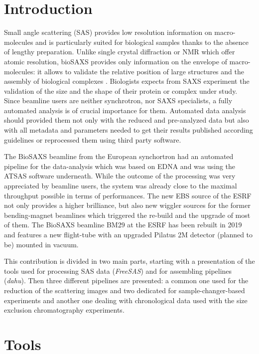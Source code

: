 \documentclass[preprint]{iucr}              %
\begin{document}
\section{Introduction}
Small angle scattering (SAS) provides low resolution information on macro-molecules and is  
particularly suited for biological samples thanks to the absence of lengthy preparation.
Unlike single crystal diffraction or NMR which offer atomic resolution, bioSAXS provides only information on the envelope of macro-molecules: it allows to validate the relative position of large structures and the assembly of biological complexes \cite{biosaxs_rev2018}. 
Biologists expects from SAXS experiment the validation of the size and the shape of their protein or complex under study. 
Since beamline users are neither synchrotron, nor SAXS specialists, a fully automated analysis is of crucial importance for them. 
Automated data analysis should provided them not only with the reduced and pre-analyzed data but also with all metadata and parameters needed to get their results published according guidelines \cite{guidelines_2017} or  reprocessed them using third party software. 

The BioSAXS beamline from the European synchortron \cite{BM29paper} had an automated pipeline for the data-analysis which was based on EDNA \cite{edna} and was using the ATSAS \cite{ATSAS2} software underneath. 
While the outcome of the processing was very appreciated by beamline users, the system was already close to the maximal throughput possible in terms of performances. 
The new EBS source \cite{EBS} of the ESRF not only provides a higher brilliance, but also new wiggler sources for the former bending-magnet beamlines which triggered the re-build and the upgrade of most of them. 
The BioSAXS beamline BM29 at the ESRF has been rebuilt in 2019 and features a new flight-tube with an upgraded  Pilatus 2M detector (planned to be) mounted in vacuum. 

This contribution is divided in two main parts, starting with a presentation of the tools used for 
processing SAS data (\textit{FreeSAS}) and for assembling pipelines (\textit{dahu}).
Then three different pipelines are presented: a common one used for the reduction of the scattering images and two dedicated for sample-changer-based experiments and another one dealing with chronological data used with the size exclusion chromatography experiments.      

\section{Tools}
\end{document}
